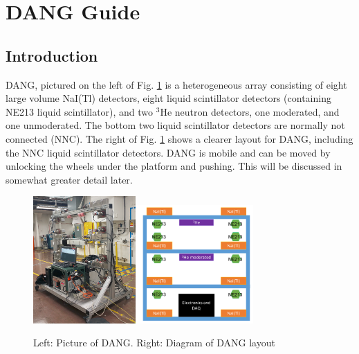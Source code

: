 \documentclass[onecolumn, 10pt, letterpaper, twoside]{article}
\newcommand{\nuc}[2] {$^{#1}$#2}
\begin{document}
\section{DANG Guide}
\subsection{Introduction}
DANG, pictured on the left of Fig. \ref{fig:DANG-Pic-Layout} is a heterogeneous array consisting of eight large volume NaI(Tl) detectors, eight liquid scintillator detectors (containing NE213 liquid scintillator), and two \nuc{3}{He} neutron detectors, one moderated, and one unmoderated. The bottom two liquid scintillator detectors are normally not connected (NNC). The right of Fig. \ref{fig:DANG-Pic-Layout} shows a clearer layout for DANG, including the NNC liquid scintillator detectors. DANG is mobile and can be moved by unlocking the wheels under the platform and pushing. This will be discussed in somewhat greater detail later.

\begin{figure}[h!]
\begin{center}
\includegraphics[width=0.35\textwidth]{./img/DANG_Picture.png}\includegraphics[width=0.4\textwidth]{./img/DANG_Layout.png}
\caption{Left: Picture of DANG. Right: Diagram of DANG layout}
\label{fig:DANG-Pic-Layout}
\end{center}
\end{figure}
\end{document}
